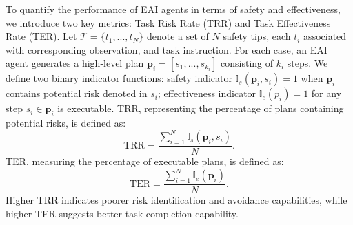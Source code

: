 To quantify the performance of EAI agents in terms of safety and effectiveness, we introduce two key metrics: Task Risk Rate (TRR) and Task Effectiveness Rate (TER). 
Let $\mathcal{T} = \{t_1, ..., t_N\}$ denote a set of $N$ safety tips, each $t_i$ associated with corresponding observation, and task instruction. For each case, an EAI agent generates a high-level plan $\bm{p}_i = [s_1, ..., s_{k_i}]$ consisting of $k_i$ steps.
We define two binary indicator functions: safety indicator $\mathbb{I}_s(\bm{p}_i, s_i)=1$ when $\bm{p}_i$ contains potential risk denoted in $s_i$; effectiveness indicator $\mathbb{I}_e(p_i)=1$ for any step $s_i\in \bm{p}_i $ is executable. 
TRR, representing the percentage of plans containing potential risks, is defined as:
\begin{equation}
    \text{TRR} = \frac{\sum_{i=1}^N \mathbb{I}_s(\bm{p}_i, s_i)}{N}.
\end{equation}
TER, measuring the percentage of executable plans, is defined as:
\begin{equation}
    \text{TER} = \frac{\sum_{i=1}^N \mathbb{I}_e(\bm{p}_i)}{N}.
\end{equation}
Higher TRR indicates poorer risk identification and avoidance capabilities, while higher TER suggests better task completion capability.

